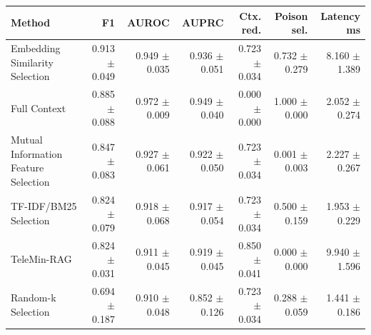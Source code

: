 \begin{tabular}{lrrrrrr}
\toprule
Method & F1 & AUROC & AUPRC & Ctx. red. & Poison sel. & Latency ms \\
\midrule
Embedding Similarity Selection & 0.913 $\pm$ 0.049 & 0.949 $\pm$ 0.035 & 0.936 $\pm$ 0.051 & 0.723 $\pm$ 0.034 & 0.732 $\pm$ 0.279 & 8.160 $\pm$ 1.389 \\
Full Context & 0.885 $\pm$ 0.088 & 0.972 $\pm$ 0.009 & 0.949 $\pm$ 0.040 & 0.000 $\pm$ 0.000 & 1.000 $\pm$ 0.000 & 2.052 $\pm$ 0.274 \\
Mutual Information Feature Selection & 0.847 $\pm$ 0.083 & 0.927 $\pm$ 0.061 & 0.922 $\pm$ 0.050 & 0.723 $\pm$ 0.034 & 0.001 $\pm$ 0.003 & 2.227 $\pm$ 0.267 \\
TF-IDF/BM25 Selection & 0.824 $\pm$ 0.079 & 0.918 $\pm$ 0.068 & 0.917 $\pm$ 0.054 & 0.723 $\pm$ 0.034 & 0.500 $\pm$ 0.159 & 1.953 $\pm$ 0.229 \\
TeleMin-RAG & 0.824 $\pm$ 0.031 & 0.911 $\pm$ 0.045 & 0.919 $\pm$ 0.045 & 0.850 $\pm$ 0.041 & 0.000 $\pm$ 0.000 & 9.940 $\pm$ 1.596 \\
Random-k Selection & 0.694 $\pm$ 0.187 & 0.910 $\pm$ 0.048 & 0.852 $\pm$ 0.126 & 0.723 $\pm$ 0.034 & 0.288 $\pm$ 0.059 & 1.441 $\pm$ 0.186 \\
\bottomrule
\end{tabular}
